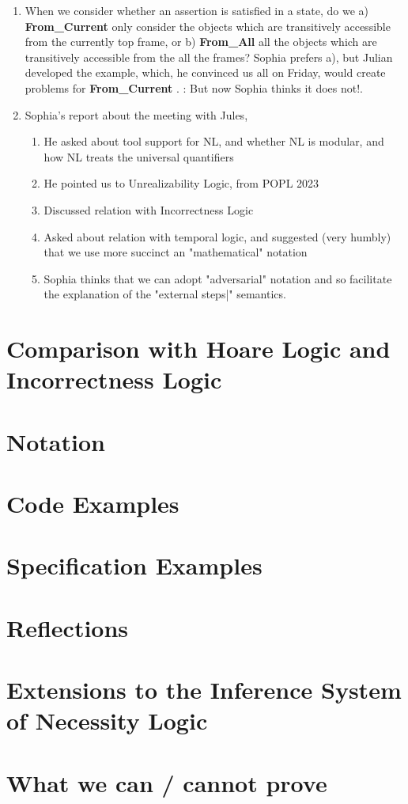 \documentclass[11pt]{article} %
\theoremstyle{definition}
\begin{document}
\begin{enumerate}
\item
When we consider whether an assertion is satisfied in a state, do we a) \textbf{From\_Current} only consider the objects which are transitively accessible from the currently top frame, or b)  \textbf{From\_All} all the objects which are transitively accessible from the all the frames? Sophia prefers a), but Julian developed the  example, which, he convinced us all on Friday, would create problems for  \textbf{From\_Current} . \SP: But now Sophia thinks it does not!.
\item
Sophia's report about the meeting with Jules, 
\begin{enumerate}
\item 
He asked about tool support for NL, and whether NL is modular, and how NL treats the universal quantifiers 
\item
He pointed us to Unrealizability  Logic, from POPL 2023
\item
Discussed relation with Incorrectness Logic
\item
Asked about relation with temporal logic, and suggested (very humbly) that we use more succinct an "mathematical" notation
\item
Sophia thinks that we can adopt "adversarial" notation and so facilitate the explanation of the "external steps|" semantics.
\end{enumerate}
\end{enumerate}



\section{Comparison with Hoare Logic and Incorrectness Logic}


\section{Notation}


\section{Code Examples}


\section{Specification Examples}


\section{Reflections}


\section{Extensions to the Inference System of Necessity Logic}


\section{What we can / cannot prove}

\end{document}
